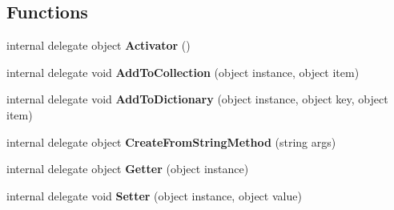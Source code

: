 \subsection*{Functions}
\begin{DoxyCompactItemize}
\item 
\mbox{\label{namespace_r_f_storage_1_1_r_f_storage___xaml_type_info_a1c64578423d9df423ab27cdc360ca737}} 
internal delegate object {\bfseries Activator} ()
\item 
\mbox{\label{namespace_r_f_storage_1_1_r_f_storage___xaml_type_info_a7cd70d621107cb8130f46afc3e8c675b}} 
internal delegate void {\bfseries Add\+To\+Collection} (object instance, object item)
\item 
\mbox{\label{namespace_r_f_storage_1_1_r_f_storage___xaml_type_info_a0f6c292d4158659847cec8d41a9cf18c}} 
internal delegate void {\bfseries Add\+To\+Dictionary} (object instance, object key, object item)
\item 
\mbox{\label{namespace_r_f_storage_1_1_r_f_storage___xaml_type_info_a6fecdfab4436d8a78f7f099e24519554}} 
internal delegate object {\bfseries Create\+From\+String\+Method} (string args)
\item 
\mbox{\label{namespace_r_f_storage_1_1_r_f_storage___xaml_type_info_ac1fe63d8bfd7d8d101ba6e66b470f858}} 
internal delegate object {\bfseries Getter} (object instance)
\item 
\mbox{\label{namespace_r_f_storage_1_1_r_f_storage___xaml_type_info_a12376be3734f0959dc596ffa87702e49}} 
internal delegate void {\bfseries Setter} (object instance, object value)
\end{DoxyCompactItemize}
